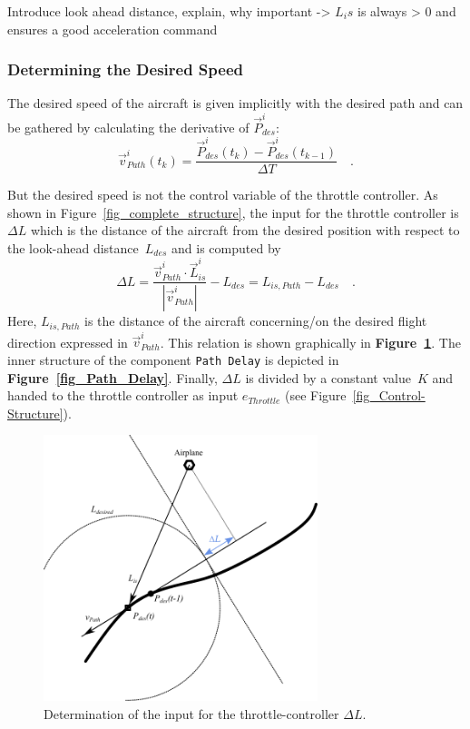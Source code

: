 \documentclass[11pt,a4paper]{scrartcl}		%
\begin{document}
Introduce look ahead distance, explain, why important -> $L_is$ is always > 0 and ensures a good acceleration command

\subsubsection*{Determining the Desired Speed}\label{ch-Determ-Desired-Speed}

The desired speed of the aircraft is given implicitly with the desired path and can be gathered by calculating the derivative of $\vec{P}_{des}^i$:
\begin{equation}
\vec{v}_{Path}^i(t_k) = \frac{\vec{P}_{des}^i(t_k)-\vec{P}_{des}^i(t_{k-1})}{\Delta T}\quad .
\end{equation}

But the desired speed is not the control variable of the throttle controller. As shown in Figure~\ref{fig_complete_structure}, the input for the throttle controller is $\Delta L$ which is the distance of the aircraft from the desired position with respect to the look-ahead distance~$L_{des}$ and is computed by
\begin{equation}
\Delta L = \frac{\vec{v}_{Path}^i \cdot \vec{L}_{is}^i}{|\vec{v}_{Path}^i|}-L_{des} = L_{is,Path}-L_{des} \quad .
\end{equation}
Here, $L_{is,Path}$ is the distance of the aircraft concerning/on the desired flight direction expressed in $\vec{v}_{Path}^i$.
This relation is shown graphically in \textbf{Figure~\ref{fig_explanation-diagram-throttle}}. The inner structure of the component \texttt{Path Delay} is depicted in \textbf{Figure~\ref{fig_Path_Delay}}.
Finally, $\Delta L$ is divided by a constant value~$K$ and handed to the throttle controller as input $e_{Throttle}$ (see Figure~\ref{fig_Control-Structure}).

\begin{figure}[tbh]
  \begin{center}
  	\includegraphics[width=8cm]{pictures/explanation-diagram-throttle.pdf}
  \end{center}
  \caption{Determination of the input for the throttle-controller $\Delta L$.}
  \label{fig_explanation-diagram-throttle}
\end{figure}
\end{document}
